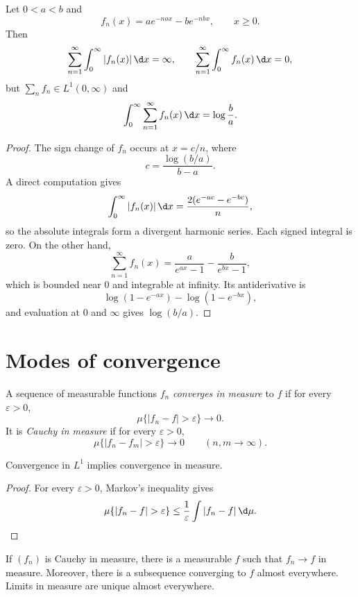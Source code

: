 \begin{exercise}
Let $0<a<b$ and
\[
f_n(x)=ae^{-nax}-be^{-nbx},
\qquad x\geq0.
\]
Then
\[
\sum_{n=1}^{\infty}\int_0^\infty|f_n(x)|\,\d x=\infty,
\qquad
\sum_{n=1}^{\infty}\int_0^\infty f_n(x)\,\d x=0,
\]
but $\sum_nf_n\in L^1(0,\infty)$ and
\[
\int_0^\infty\sum_{n=1}^{\infty}f_n(x)\,\d x
 =\log\frac ba.
\]
\end{exercise}

\begin{proof}
The sign change of $f_n$ occurs at $x=c/n$, where
\[
c=\frac{\log(b/a)}{b-a}.
\]
A direct computation gives
\[
\int_0^\infty|f_n(x)|\,\d x
 =\frac{2(e^{-ac}-e^{-bc})}{n},
\]
so the absolute integrals form a divergent harmonic series. Each signed integral is zero. On the other hand,
\[
\sum_{n=1}^{\infty}f_n(x)
 =\frac{a}{e^{ax}-1}-\frac{b}{e^{bx}-1},
\]
which is bounded near $0$ and integrable at infinity. Its antiderivative is
\[
\log(1-e^{-ax})-\log(1-e^{-bx}),
\]
and evaluation at $0$ and $\infty$ gives $\log(b/a)$.
\end{proof}

\section{Modes of convergence}

\begin{de}
A sequence of measurable functions $f_n$ \emph{converges in measure} to $f$ if for every $\varepsilon>0$,
\[
\mu\{|f_n-f|>\varepsilon\}\longrightarrow0.
\]
It is \emph{Cauchy in measure} if for every $\varepsilon>0$,
\[
\mu\{|f_n-f_m|>\varepsilon\}\longrightarrow0
\qquad(n,m\to\infty).
\]
\end{de}

\begin{prop}
Convergence in $L^1$ implies convergence in measure.
\end{prop}

\begin{proof}
For every $\varepsilon>0$, Markov's inequality gives
\[
\mu\{|f_n-f|>\varepsilon\}
 \leq\frac1\varepsilon\int|f_n-f|\,\d\mu.
\]
\end{proof}

\begin{thm}
If $(f_n)$ is Cauchy in measure, there is a measurable $f$ such that $f_n\to f$ in measure. Moreover, there is a subsequence converging to $f$ almost everywhere. Limits in measure are unique almost everywhere.
\end{thm}

